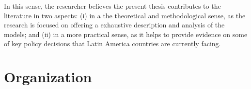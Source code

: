 In this sense, the researcher believes the present thesis contributes to the literature in two aspects: (i) in a the theoretical and methodological sense, as the research is focused on offering a exhaustive description and analysis of the models; and (ii) in a more practical sense, as it helps to provide evidence on some of key policy decisions that Latin America countries are currently facing.

\section{Organization}